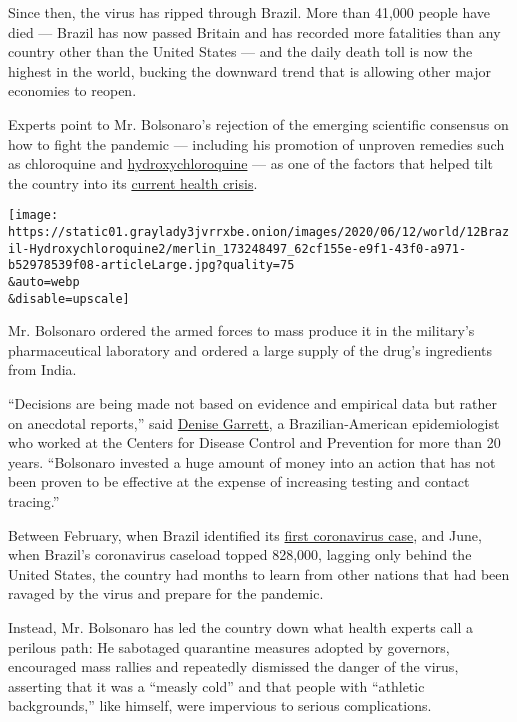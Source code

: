 Since then, the virus has ripped through Brazil. More than 41,000 people
have died --- Brazil has now passed Britain and has recorded more
fatalities than any country other than the United States --- and the
daily death toll is now the highest in the world, bucking the downward
trend that is allowing other major economies to reopen.

Experts point to Mr. Bolsonaro's rejection of the emerging scientific
consensus on how to fight the pandemic --- including his promotion of
unproven remedies such as chloroquine and
\href{https://www.nytimes3xbfgragh.onion/2020/06/20/health/hydroxychloroquine-coronavirus-trial.html}{hydroxychloroquine}
--- as one of the factors that helped tilt the country into its
\href{https://www.nytimes3xbfgragh.onion/2020/05/12/world/americas/latin-america-virus-death.html}{current
health crisis}.

\texttt{[image: https://static01.graylady3jvrrxbe.onion/images/2020/06/12/world/12Brazil-Hydroxychloroquine2/merlin\_173248497\_62cf155e-e9f1-43f0-a971-b52978539f08-articleLarge.jpg?quality=75\\\&auto=webp\\\&disable=upscale]}

Mr. Bolsonaro ordered the armed forces to mass produce it in the
military's pharmaceutical laboratory and ordered a large supply of the
drug's ingredients from India.

``Decisions are being made not based on evidence and empirical data but
rather on anecdotal reports,'' said
\href{https://www.sabin.org/updates/pressreleases/dr-denise-garrett-joins-sabin-director-coalition-against-typhoid}{Denise
Garrett}, a Brazilian-American epidemiologist who worked at the Centers
for Disease Control and Prevention for more than 20 years. ``Bolsonaro
invested a huge amount of money into an action that has not been proven
to be effective at the expense of increasing testing and contact
tracing.''

Between February, when Brazil identified its
\href{https://www.nytimes3xbfgragh.onion/2020/02/26/world/americas/brazil-italy-coronavirus.html}{first
coronavirus case}, and June, when Brazil's coronavirus caseload topped
828,000, lagging only behind the United States, the country had months
to learn from other nations that had been ravaged by the virus and
prepare for the pandemic.

Instead, Mr. Bolsonaro has led the country down what health experts call
a perilous path: He sabotaged quarantine measures adopted by governors,
encouraged mass rallies and repeatedly dismissed the danger of the
virus, asserting that it was a ``measly cold'' and that people with
``athletic backgrounds,'' like himself, were impervious to serious
complications.

